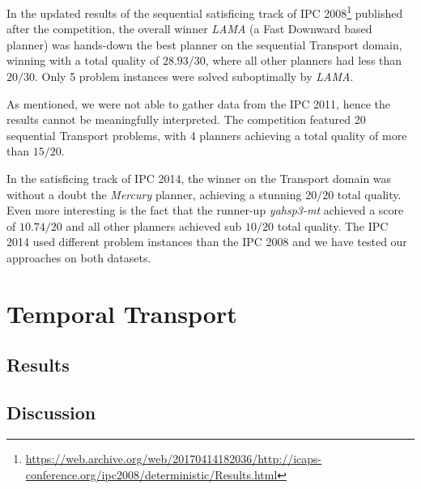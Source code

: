 In the updated results of the sequential satisficing track of IPC 2008\footnote{\url{https://web.archive.org/web/20170414182036/http://icaps-conference.org/ipc2008/deterministic/Results.html}} published after the competition,
the overall winner \textit{LAMA} (a Fast Downward based planner)
was hands-down the best planner on the sequential Transport domain, winning
with a total quality of $28.93/30$, where all other planners had less than $20/30$.
Only 5 problem instances were solved suboptimally by \textit{LAMA}.

As mentioned, we were not able to gather data from the IPC 2011,
hence the results cannot be meaningfully interpreted.
The competition featured 20 sequential Transport problems,
with 4 planners achieving a total quality of more than $15/20$.

In the satisficing track of IPC 2014, the winner on the Transport domain
was without a doubt the \textit{Mercury} planner, achieving
a stunning $20/20$ total quality. Even more interesting is the fact that
the runner-up \textit{yahsp3-mt} achieved a score of $10.74/20$
and all other planners achieved sub $10/20$ total quality.
The IPC 2014 used different problem instances than the IPC 2008
and we have tested our approaches on both datasets.















\section{Temporal Transport}


\subsection{Results}



\subsection{Discussion}


